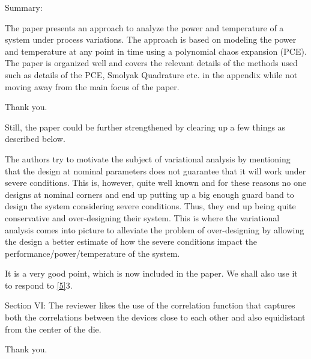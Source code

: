 \begin{reviewer}
Summary:

The paper presents an approach to analyze the power and temperature of a system under process variations. The approach is based on modeling the power and temperature at any point in time using a polynomial chaos expansion (PCE). The paper is organized well and covers the relevant details of the methods used such as details of the PCE, Smolyak Quadrature etc. in the appendix while not moving away from the main focus of the paper.
\end{reviewer}
\begin{authors}
Thank you.
\end{authors}

\begin{reviewer}
Still, the paper could be further strengthened by clearing up a few things as described below.

The authors try to motivate the subject of variational analysis by mentioning that the design at nominal parameters does not guarantee that it will work under severe conditions. This is, however, quite well known and for these reasons no one designs at nominal corners and end up putting up a big enough guard band to design the system considering severe conditions. Thus, they end up being quite conservative and over-designing their system. This is where the variational analysis comes into picture to alleviate the problem of over-designing by allowing the design a better estimate of how the severe conditions impact the performance/power/temperature of the system.
\end{reviewer}
\begin{authors}
It is a very good point, which is now included in the paper.
We shall also use it to respond to \cref{5}{3}.

\begin{actions}
\end{actions}
\end{authors}

\begin{reviewer}
Section VI: The reviewer likes the use of the correlation function that captures both the correlations between the devices close to each other and also equidistant from the center of the die.
\end{reviewer}
\begin{authors}
Thank you.
\end{authors}


